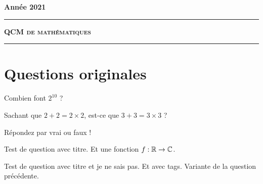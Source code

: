 \documentclass[12pt,a4paper]{article}
\begin{document}


\hfill\textbf{Ann\'ee 2021}

\vspace*{0.5ex}
\hrule\vspace*{1.5ex}
\hfil\textsc{\textbf{\Large QCM de mathématiques}}
\vspace*{1ex} \hrule
\vspace*{5ex}


\section{Questions originales}


\begin{question}

Combien font $2^{10}$ ? %

\begin{answers}
\end{answers}
\end{question}



\begin{question}
Sachant que $2+2=2\times 2$,
est-ce que $3+3 = 3\times 3$ ?

Répondez par vrai ou faux !
\begin{answers}



\end{answers}
\end{question}



\begin{question}

Test de question avec titre. Et une fonction $f : \mathbb{R} \to \mathbb{C}$.
\begin{answers}


\end{answers}
\end{question}



\begin{question} 
\qkeeporder
\qidontknow

Test de question avec titre et je ne sais pas. Et avec tags. Variante de la question précédente.

\begin{answers}
\end{answers}
\end{question}
\end{document}
